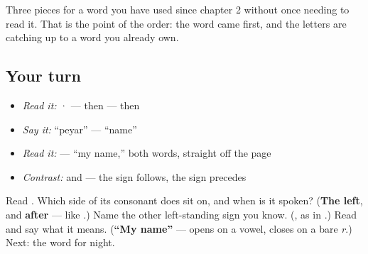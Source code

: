Three pieces for a word you have used since chapter 2 without once needing to read it. That is the point of the order: the word came first, and the letters are catching up to a word you already own.

\subsection*{Your turn}
\begin{itemize}
\raggedright
  \item \emph{Read it:} \textbf{} · \textbf{} — then \textbf{} — then \textbf{}
  \item \emph{Say it:} \textquotedblleft{}peyar\textquotedblright{} — \textquotedblleft{}name\textquotedblright{}
  \item \emph{Read it:} \textbf{ } — \textquotedblleft{}my name,\textquotedblright{} both words, straight off the page
  \item \emph{Contrast:} \textbf{} and \textbf{} — the  sign follows, the  sign precedes
\end{itemize}

\begin{tcolorbox}[breakable,colback=teal!4,colframe=teal!35!black,title={Before you move on}]
Read \textbf{}. Which side of its consonant does \textbf{} sit on, and when is it spoken? (\textbf{The left}, and \textbf{after} — like .) Name the other left-standing sign you know. (\textbf{}, as in \textbf{}.) Read \textbf{ } and say what it means. (\textbf{\textquotedblleft{}My name\textquotedblright{}} —  opens on a vowel,  closes on a bare \emph{r}.) Next: the word for night.
\end{tcolorbox}
